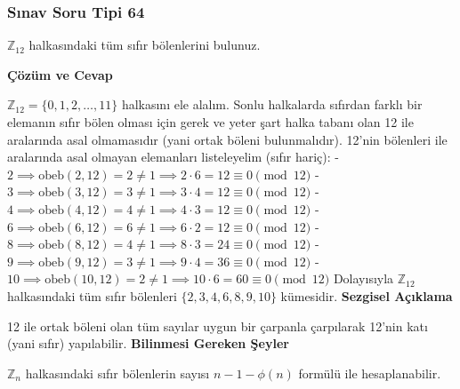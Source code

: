 \documentclass[11pt, a4paper]{article}
\newenvironment{cozum}{
    \vspace{0.5cm}
    \noindent\textcolor{green!60!black}{\faCheckCircle\enspace \textbf{\Large Çözüm ve Cevap}}\par\vspace{0.2cm}
}{}
\newenvironment{sezgisel}{
    \vspace{0.5cm}
    \noindent\textcolor{orange!80!black}{\faLightbulb\enspace \textbf{\Large Sezgisel Açıklama}}\par\vspace{0.2cm}
    \itshape
}{}
\newenvironment{bilgi}{
    \vspace{0.5cm}
    \noindent\textcolor{red!70!black}{\faExclamationTriangle\enspace \textbf{\Large Bilinmesi Gereken Şeyler}}\par\vspace{0.2cm}
}{}
\begin{document}
\subsubsection{Sınav Soru Tipi 64}
\begin{sinavbox}
$\mathbb{Z}_{12}$ halkasındaki tüm sıfır bölenlerini bulunuz.
\end{sinavbox}
\begin{cozum}
$\mathbb{Z}_{12} = \{0, 1, 2, \dots, 11\}$ halkasını ele alalım.
Sonlu halkalarda sıfırdan farklı bir elemanın sıfır bölen olması için gerek ve yeter şart halka tabanı olan 12 ile aralarında asal olmamasıdır (yani ortak böleni bulunmalıdır).
12'nin bölenleri ile aralarında asal olmayan elemanları listeleyelim (sıfır hariç):
- $2 \implies \text{obeb}(2, 12) = 2 \neq 1 \implies 2 \cdot 6 = 12 \equiv 0 \pmod{12}$
- $3 \implies \text{obeb}(3, 12) = 3 \neq 1 \implies 3 \cdot 4 = 12 \equiv 0 \pmod{12}$
- $4 \implies \text{obeb}(4, 12) = 4 \neq 1 \implies 4 \cdot 3 = 12 \equiv 0 \pmod{12}$
- $6 \implies \text{obeb}(6, 12) = 6 \neq 1 \implies 6 \cdot 2 = 12 \equiv 0 \pmod{12}$
- $8 \implies \text{obeb}(8, 12) = 4 \neq 1 \implies 8 \cdot 3 = 24 \equiv 0 \pmod{12}$
- $9 \implies \text{obeb}(9, 12) = 3 \neq 1 \implies 9 \cdot 4 = 36 \equiv 0 \pmod{12}$
- $10 \implies \text{obeb}(10, 12) = 2 \neq 1 \implies 10 \cdot 6 = 60 \equiv 0 \pmod{12}$
Dolayısıyla $\mathbb{Z}_{12}$ halkasındaki tüm sıfır bölenleri $\{2, 3, 4, 6, 8, 9, 10\}$ kümesidir.
\end{cozum}
\begin{sezgisel}
12 ile ortak böleni olan tüm sayılar uygun bir çarpanla çarpılarak 12'nin katı (yani sıfır) yapılabilir.
\end{sezgisel}
\begin{bilgi}
$\mathbb{Z}_n$ halkasındaki sıfır bölenlerin sayısı $n - 1 - \phi(n)$ formülü ile hesaplanabilir.
\end{bilgi}

\newpage
\end{document}
